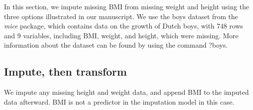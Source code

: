 \documentclass[
]{article}
\newenvironment{Shaded}{}{}
\newcommand{\AttributeTok}[1]{\textcolor[rgb]{0.84,0.23,0.29}{#1}}
\newcommand{\CommentTok}[1]{\textcolor[rgb]{0.42,0.45,0.49}{#1}}
\newcommand{\ConstantTok}[1]{\textcolor[rgb]{0.00,0.36,0.77}{#1}}
\newcommand{\DecValTok}[1]{\textcolor[rgb]{0.00,0.36,0.77}{#1}}
\newcommand{\FunctionTok}[1]{\textcolor[rgb]{0.44,0.26,0.76}{#1}}
\newcommand{\NormalTok}[1]{\textcolor[rgb]{0.14,0.16,0.18}{#1}}
\newcommand{\OtherTok}[1]{\textcolor[rgb]{0.44,0.26,0.76}{#1}}
\newcommand{\SpecialCharTok}[1]{\textcolor[rgb]{0.00,0.36,0.77}{#1}}
\newcommand{\StringTok}[1]{\textcolor[rgb]{0.01,0.18,0.38}{#1}}
\begin{document}
In this section, we impute missing BMI from missing weight and height
using the three options illustrated in our manuscript. We use the boys
dataset from the \emph{mice} package, which contains data on the growth
of Dutch boys, with 748 rows and 9 variables, including BMI, weight, and
height, which were missing. More information about the dataset can be
found by using the command ?boys.

\subsection{Impute, then transform}\label{impute-then-transform}

We impute any missing height and weight data, and append BMI to the
imputed data afterward. BMI is not a predictor in the imputation model
in this case.

\begin{Shaded}
\end{Shaded}
\end{document}
